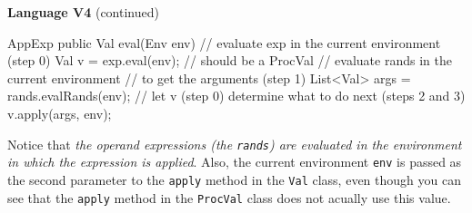 \begin{minipage}[t]{\sw}
\slidenumber
\LARGE
{\bf Language V4} (continued)\exx
\Large
\emm{}
\Large
\begin{qv}
AppExp
    public Val eval(Env env) {
        // evaluate exp in the current environment (step 0)
        Val v = exp.eval(env); // should be a ProcVal
        // evaluate rands in the current environment
        // to get the arguments (step 1)
        List<Val> args = rands.evalRands(env);
        // let v (step 0) determine what to do next (steps 2 and 3)
        v.apply(args, env);
    }
\end{qv}
\LARGE
Notice that {\em the operand expressions (the \verb'rands')
are evaluated in the environment in which the expression is applied}.
Also, the current environment \verb'env' is passed as the second parameter
to the \verb'apply' method in the \verb'Val' class, 
even though you can see that the \verb'apply' method
in the \verb'ProcVal' class does not acually use this value.\exx
\end{minipage}
\clearpage
